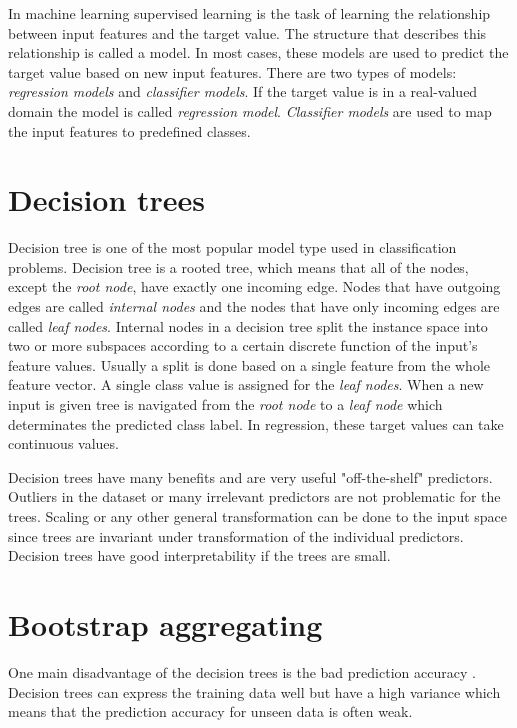In machine learning supervised learning is the task of learning the relationship between input features and the target value. The structure that describes this relationship is called a model. In most cases, these models are used to predict the target value based on new input features. There are two types of models: \textit{regression models} and \textit{classifier models}. If the target value is in a real-valued domain the model is called \textit{regression model}. \textit{Classifier models} are used to map the input features to predefined classes. \cite{rokach2005top}

\section{Decision trees}
Decision tree is one of the most popular model type used in classification problems. Decision tree is a rooted tree, which means that all of the nodes, except the \textit{root node}, have exactly one incoming edge. Nodes that have outgoing edges are called \textit{internal nodes} and the nodes that have only incoming edges are called \textit{leaf nodes}. Internal nodes in a decision tree split the instance space into two or more subspaces according to a certain discrete function of the input's feature values. Usually a split is done based on a single feature from the whole feature vector. A single class value is assigned for the \textit{leaf nodes}. When a new input is given tree is navigated from the \textit{root node} to a \textit{leaf node} which determinates the predicted class label. In regression, these target values can take continuous values. \cite{rokach2005top}

Decision trees have many benefits and are very useful "off-the-shelf" predictors. Outliers in the dataset or many irrelevant predictors are not problematic for the trees. Scaling or any other general transformation can be done to the input space since trees are invariant under transformation of the individual predictors. \cite{friedman2001elements} Decision trees have good interpretability if the trees are small.

\section{Bootstrap aggregating}
One main disadvantage of the decision trees is the bad prediction accuracy \cite{friedman2001elements}. Decision trees can express the training data well but have a high variance which means that the prediction accuracy for unseen data is often weak.

